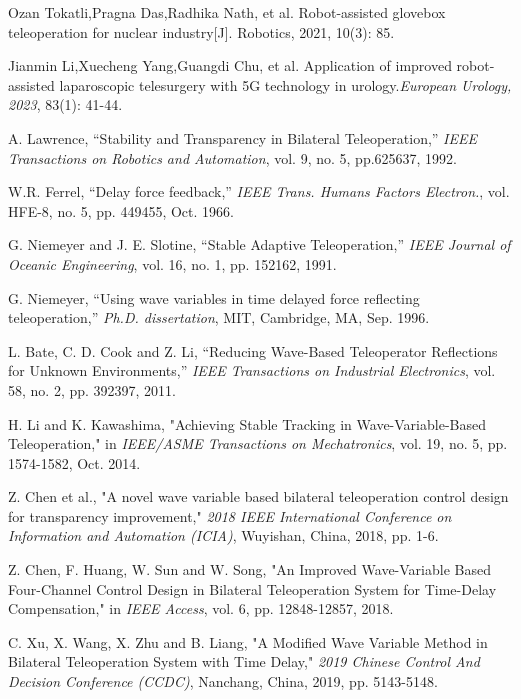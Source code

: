 \begin{thebibliography}{00}
     Ozan Tokatli,Pragna Das,Radhika Nath, et al. Robot-assisted glovebox teleoperation for nuclear industry[J]. Robotics, 2021, 10(3): 85.
 
     Jianmin Li,Xuecheng Yang,Guangdi Chu, et al. Application of improved robot-assisted laparoscopic telesurgery with 5G technology in urology.\textit{European Urology, 2023}, 83(1): 41-44.

     A. Lawrence, “Stability and Transparency in Bilateral Teleoperation,” \textit{IEEE Transactions on Robotics and Automation}, vol. 9, no. 5, pp.625637, 1992.

     W.R. Ferrel, “Delay force feedback,” \textit{IEEE Trans. Humans Factors Electron.}, vol. HFE-8, no. 5, pp. 449455, Oct. 1966.

     G. Niemeyer and J. E. Slotine, “Stable Adaptive Teleoperation,” \textit{IEEE Journal of Oceanic Engineering}, vol. 16, no. 1, pp. 152162, 1991.

     G. Niemeyer, “Using wave variables in time delayed force reflecting teleoperation,” \textit{Ph.D. dissertation}, MIT, Cambridge, MA, Sep. 1996.

     L. Bate, C. D. Cook and Z. Li, “Reducing Wave-Based Teleoperator Reflections for Unknown Environments,” \textit{IEEE Transactions on Industrial Electronics}, vol. 58, no. 2, pp. 392397, 2011.

     H. Li and K. Kawashima, "Achieving Stable Tracking in Wave-Variable-Based Teleoperation," in \textit{IEEE/ASME Transactions on Mechatronics}, vol. 19, no. 5, pp. 1574-1582, Oct. 2014.

     Z. Chen et al., "A novel wave variable based bilateral teleoperation control design for transparency improvement," \textit{2018 IEEE International Conference on Information and Automation (ICIA)}, Wuyishan, China, 2018, pp. 1-6.

     Z. Chen, F. Huang, W. Sun and W. Song, "An Improved Wave-Variable Based Four-Channel Control Design in Bilateral Teleoperation System for Time-Delay Compensation," in \textit{IEEE Access}, vol. 6, pp. 12848-12857, 2018.

     C. Xu, X. Wang, X. Zhu and B. Liang, "A Modified Wave Variable Method in Bilateral Teleoperation System with Time Delay," \textit{2019 Chinese Control And Decision Conference (CCDC)}, Nanchang, China, 2019, pp. 5143-5148.


\end{thebibliography}
